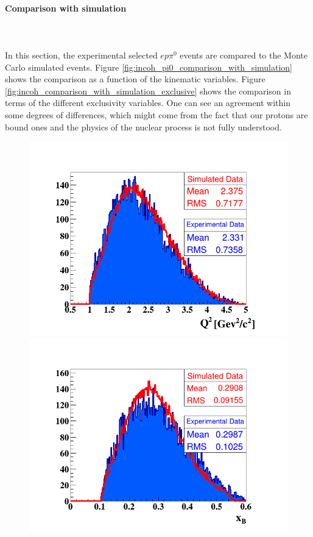\paragraph{Comparison with simulation}
~\\
~\\
In this section, the experimental selected $ep\pi^{0}$ events are compared to the Monte Carlo simulated events. Figure \ref{fig:incoh_pi0_comparison_with_simulation} shows the comparison as a function of the kinematic variables. Figure \ref{fig:incoh_comparison_with_simulation_exclusive} shows the comparison in terms of the different exclusivity variables. One can see an agreement within some degrees of differences, which might come from the fact that our protons are bound ones and the physics of the nuclear process is not fully understood. 
\begin{figure}[h!]
\includegraphics[scale=0.35]{fig_dvcs/comp/Q2_InCoh_pi0.png}
\includegraphics[scale=0.35]{fig_dvcs/comp/xB_InCoh_pi0.png}

\end{figure}
